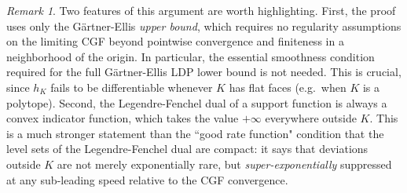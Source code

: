 \documentclass[a4paper,11pt]{article}
\theoremstyle{plain}
\theoremstyle{definition}
\theoremstyle{remark}
\newtheorem*{rem}{Remark}
\begin{document}
\begin{appendix}
\begin{rem}
Two features of this argument are worth highlighting. First, the proof uses only the G\"artner-Ellis \textit{upper bound}, which requires no regularity assumptions on the limiting CGF beyond pointwise convergence and finiteness in a neighborhood of the origin. In particular, the essential smoothness condition required for the full G\"artner-Ellis LDP lower bound is not needed. This is crucial, since $h_K$ fails to be differentiable whenever $K$ has flat faces (e.g.~when $K$ is a polytope). Second, the Legendre-Fenchel dual of a support function is always a convex indicator function, which takes the value $+\infty$ everywhere outside $K$. This is a much stronger statement than the ``good rate function" condition that the level sets of the Legendre-Fenchel dual are compact: it says that deviations outside $K$ are not merely exponentially rare, but \textit{super-exponentially} suppressed at any sub-leading speed relative to the CGF convergence.
\end{rem}

\end{appendix}

\newpage
{}

\end{document}
